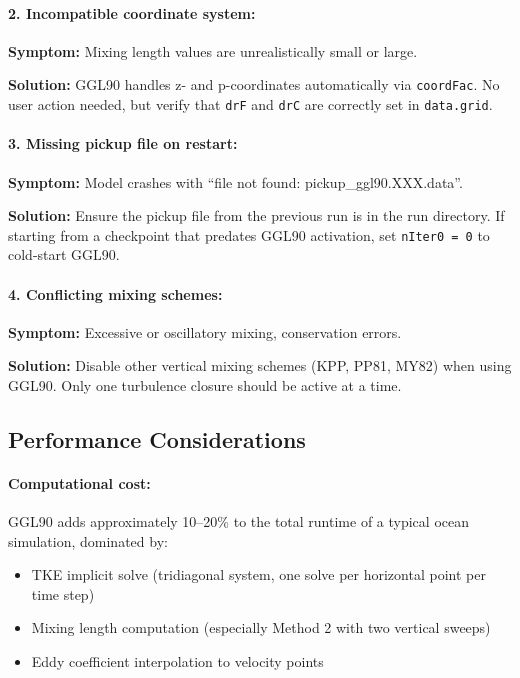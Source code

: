 \documentclass[12pt,letterpaper]{article}
\begin{document}
\paragraph{2. Incompatible coordinate system:}

\textbf{Symptom:} Mixing length values are unrealistically small or large.

\textbf{Solution:} GGL90 handles z- and p-coordinates automatically via \verb|coordFac|. No user action needed, but verify that \verb|drF| and \verb|drC| are correctly set in \verb|data.grid|.

\paragraph{3. Missing pickup file on restart:}

\textbf{Symptom:} Model crashes with ``file not found: pickup_ggl90.XXX.data''.

\textbf{Solution:} Ensure the pickup file from the previous run is in the run directory. If starting from a checkpoint that predates GGL90 activation, set \verb|nIter0 = 0| to cold-start GGL90.

\paragraph{4. Conflicting mixing schemes:}

\textbf{Symptom:} Excessive or oscillatory mixing, conservation errors.

\textbf{Solution:} Disable other vertical mixing schemes (KPP, PP81, MY82) when using GGL90. Only one turbulence closure should be active at a time.

\subsection{Performance Considerations}

\paragraph{Computational cost:} GGL90 adds approximately 10--20\% to the total runtime of a typical ocean simulation, dominated by:
\begin{itemize}
\item TKE implicit solve (tridiagonal system, one solve per horizontal point per time step)
\item Mixing length computation (especially Method 2 with two vertical sweeps)
\item Eddy coefficient interpolation to velocity points
\end{itemize}
\end{document}
